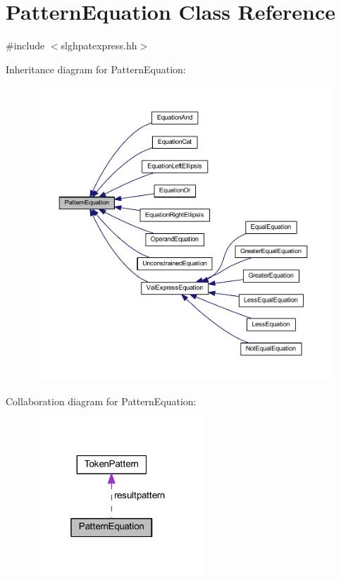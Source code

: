 \hypertarget{class_pattern_equation}{}\section{Pattern\+Equation Class Reference}
\label{class_pattern_equation}


{\ttfamily \#include $<$slghpatexpress.\+hh$>$}



Inheritance diagram for Pattern\+Equation\+:
\nopagebreak
\begin{figure}[H]
\begin{center}
\leavevmode
\includegraphics[width=350pt]{class_pattern_equation__inherit__graph}
\end{center}
\end{figure}


Collaboration diagram for Pattern\+Equation\+:
\nopagebreak
\begin{figure}[H]
\begin{center}
\leavevmode
\includegraphics[width=181pt]{class_pattern_equation__coll__graph}
\end{center}
\end{figure}
